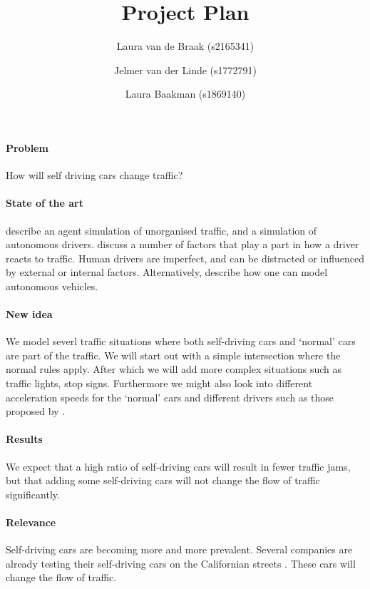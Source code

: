 \documentclass[a4paper]{article}
\title{Project Plan\\ \sc{traffic simulation self-driving cars}}
\author{%
	Laura van de Braak (s2165341) \and 
	Jelmer van der Linde (s1772791) \and 
	Laura Baakman (s1869140)
}
\begin{document}
\maketitle

\paragraph{Problem} How will self driving cars change traffic?
\paragraph{State of the art} \citeauthor{paruchuri2002multi} describe an agent simulation of unorganised traffic, and \citeauthor{jiang2010microscopic} a simulation of autonomous drivers. \citeauthor{paruchuri2002multi} discuss a number of factors that play a part in how a driver reacts to traffic. Human drivers are imperfect, and can be distracted or influenced by external or internal factors. Alternatively, \citeauthor{jiang2010microscopic} describe how one can model autonomous vehicles.
\paragraph{New idea} We model severl traffic situations where both self-driving cars and `normal' cars are part of the traffic. We will start out with a simple intersection where the normal rules apply. After which we will add more complex situations such as traffic lights, stop signs. Furthermore we might also look into different acceleration speeds for the `normal' cars and different drivers such as those proposed by \citeauthor{paruchuri2002multi}.
\paragraph{Results} We expect that a high ratio of self-driving cars will result in fewer traffic jams, but that adding some self-driving cars will not change the flow of traffic significantly.  
\paragraph{Relevance} Self-driving cars are becoming more and more prevalent. Several companies are already testing their self-driving cars on the Californian streets \cite{honda}. These cars will change the flow of traffic. 

\printbibliography
\end{document}
